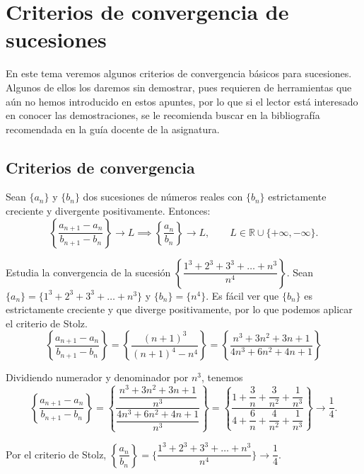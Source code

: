 \chapter{Criterios de convergencia de sucesiones}\label{chp:Tema8}

En este tema veremos algunos criterios de convergencia básicos para sucesiones. Algunos de ellos los daremos sin demostrar, pues requieren de herramientas que aún no hemos introducido en estos apuntes, por lo que si el lector está interesado en conocer las demostraciones, se le recomienda buscar en la bibliografía recomendada en la guía docente de la asignatura.


\section{Criterios de convergencia}
\begin{teo}
    Sean $\{a_n\}$ y $\{b_n\}$ dos sucesiones de números reales con $\{b_n\}$ estrictamente creciente y divergente positivamente.
    Entonces:
    \begin{equation*}
        \left\{\dfrac{a_{n+1} - a_n}{b_{n+1} - b_n}\right\} \longrightarrow L \implies \left\{\dfrac{a_n}{b_n}\right\} \longrightarrow L, \qquad L \in \mathbb{R} \cup \{+ \infty, -\infty\}.
    \end{equation*}
\end{teo}

\begin{ejemplo}
    Estudia la convergencia de la sucesión $\left\{\dfrac{1^3 + 2^3 + 3^3 + \dots + n^3}{n^4}\right\}$.
    \newline
    \newline
    Sean $\{a_n\} = \{1^3 + 2^3 + 3^3 + \dots + n^3\}$ y $\{b_n\} = \{n^4\}$. Es fácil ver que $\{b_n\}$ es estrictamente
    creciente y que diverge positivamente, por lo que podemos aplicar el criterio de Stolz.
    \begin{equation*}
        \left\{\frac{a_{n+1} - a_n}{b_{n+1} - b_n}\right\} = \left\{\frac{(n+1)^3}{(n+1)^4- n^4}\right\} = \left\{\frac{n^3 + 3n^2 + 3n + 1}{4n^3 + 6n^2 + 4n + 1}\right\}
    \end{equation*}
    
    Dividiendo numerador y denominador por $n^3$, tenemos
    \begin{equation*}
        \left\{\dfrac{a_{n+1} - a_n}{b_{n+1} - b_n}\right\} = \left\{\dfrac{\dfrac{n^3 + 3n^2 + 3n + 1}{n^3}}{\dfrac{4n^3 + 6n^2 + 4n + 1}{n^3}}\right\} =
        \left\{ \dfrac{1 + \dfrac{3}{n} + \dfrac{3}{n^2} + \dfrac{1}{n^3}}{4 + \dfrac{6}{n} + \dfrac{4}{n^2} + \dfrac{1}{n^3}} \right\} \longrightarrow \dfrac{1}{4}.
    \end{equation*}
    
    Por el criterio de Stolz, $\left\{\dfrac{a_n}{b_n}\right\} = \{\dfrac{1^3 + 2^3 + 3^3 + \dots + n^3}{n^4}\} \longrightarrow \dfrac{1}{4}$.
\end{ejemplo}


